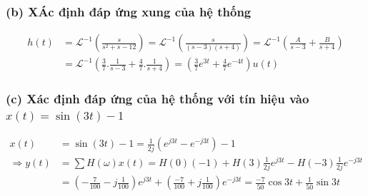 \documentclass{article}
\begin{document}
\subsubsection*{(b) XÁc định đáp ứng xung của hệ thống}
\begin{equation*}
    \begin{split}
        h(t)&=\mathscr{L}^{-1}\left(\frac{s}{s^2+s-12}\right)=\mathscr{L}^{-1}\left(\frac{s}{(s-3)(s+4)}\right)=\mathscr{L}^{-1}\left(\frac{A}{s-3}+\frac{B}{s+4}\right)\\&=\mathscr{L}^{-1}\left(\frac{3}{7}.\frac{1}{s-3}+\frac{4}{7}.\frac{1}{s+4}\right)=\left(\frac{3}{7}e^{3t}+\frac{4}{7}e^{-4t}\right)u(t)
    \end{split}
\end{equation*}
\subsubsection*{(c) Xác định đáp ứng của hệ thống với tín hiệu vào $x(t)=\sin{(3t)}-1$}
\begin{equation*}
    \begin{split}
        x(t)&=\sin{(3t)}-1=\frac{1}{2j}(e^{j3t}-e^{-j3t})-1\\
        \Rightarrow y(t)&=\sum H(\omega)x(t)=H(0)(-1)+H(3)\frac{1}{2j}e^{j3t}-H(-3)\frac{1}{2j}e^{-j3t}\\&=\left(-\frac{7}{100}-j\frac{1}{100}\right)e^{j3t}+\left(\frac{-7}{100}+j\frac{1}{100}\right)e^{-j3t}=\frac{-7}{50}\cos{3t}+\frac{1}{50}\sin{3t}
    \end{split}
\end{equation*}
\end{document}
